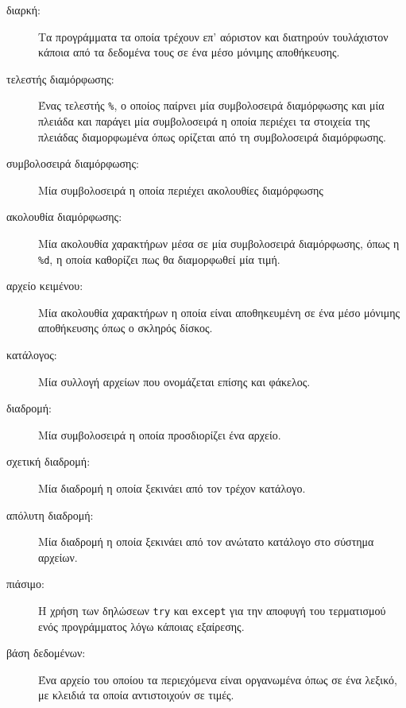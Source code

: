 \documentclass[10pt]{book}
\begin{document}
\begin{description}

\item[διαρκή:] Τα προγράμματα τα οποία τρέχουν επ' αόριστον και διατηρούν τουλάχιστον κάποια από τα δεδομένα τους
σε ένα μέσο μόνιμης αποθήκευσης.

\item[τελεστής διαμόρφωσης:] Ένας τελεστής {\tt \%}, ο οποίος παίρνει μία συμβολοσειρά διαμόρφωσης και μία πλειάδα 
και παράγει μία συμβολοσειρά η οποία περιέχει τα στοιχεία της πλειάδας διαμορφωμένα όπως ορίζεται από τη συμβολοσειρά διαμόρφωσης.

\item[συμβολοσειρά διαμόρφωσης:] Μία συμβολοσειρά η οποία περιέχει ακολουθίες διαμόρφωσης

\item[ακολουθία διαμόρφωσης:] Μία ακολουθία χαρακτήρων μέσα σε μία συμβολοσειρά διαμόρφωσης, όπως η {\tt \%d},
η οποία καθορίζει πως θα διαμορφωθεί μία τιμή.

\item[αρχείο κειμένου:] Μία ακολουθία χαρακτήρων η οποία είναι αποθηκευμένη σε ένα μέσο μόνιμης αποθήκευσης
όπως ο σκληρός δίσκος.

\item[κατάλογος:] Μία συλλογή αρχείων που ονομάζεται επίσης και φάκελος.

\item[διαδρομή:] Μία συμβολοσειρά η οποία προσδιορίζει ένα αρχείο.

\item[σχετική διαδρομή:] Μία διαδρομή η οποία ξεκινάει από τον τρέχον κατάλογο.

\item[απόλυτη διαδρομή:] Μία διαδρομή η οποία ξεκινάει από τον ανώτατο κατάλογο στο σύστημα αρχείων.

\item[πιάσιμο:] Η χρήση των δηλώσεων  {\tt try}  και  {\tt except}  για την αποφυγή του τερματισμού ενός
προγράμματος λόγω κάποιας εξαίρεσης.

\item[βάση δεδομένων:] Ένα αρχείο του οποίου τα περιεχόμενα είναι οργανωμένα όπως σε ένα λεξικό,
με κλειδιά τα οποία αντιστοιχούν σε τιμές. 

\end{description}
\end{document}
